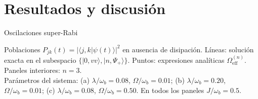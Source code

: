 \documentclass[
11pt,notheorems,hyperref={pdfauthor=whatever}
]{beamer}
\begin{document}
\section{Resultados y discusión}

\begin{frame}{Oscilaciones super-Rabi}
	
	\vspace{-15pt}
	
	\begin{center}
		\resizebox{0.70\textwidth}{!}{%
		}
	\end{center}
	
	\vspace{-6pt}
	
	{\footnotesize
		Poblaciones $P_{jk}(t) = |\langle j,k|\psi(t)\rangle|^2$ en ausencia de disipación.
		Líneas: solución exacta en el subespacio $\{|0,vv\rangle, |n,\Psi_+\rangle\}$.
		Puntos: expresiones analíticas $\Omega_\mathrm{eff}^{(n)}$.
		Paneles interiores: $n=3$. \\
		Parámetros del sistema:
		(a) $\lambda/\omega_b = 0.08$, $\Omega/\omega_b = 0.01$;
		(b) $\lambda/\omega_b = 0.20$, $\Omega/\omega_b = 0.01$;
		(c) $\lambda/\omega_b = 0.08$, $\Omega/\omega_b = 0.50$.
		En todos los paneles $J/\omega_b = 0.5$.
	}
	
\end{frame}
\end{document}
